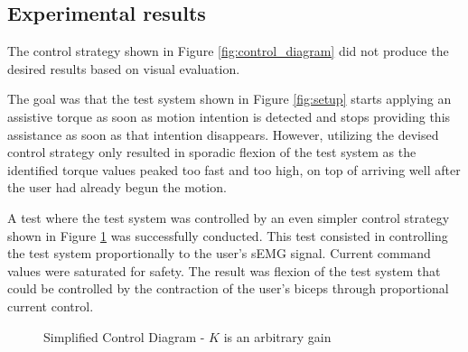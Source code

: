 \FloatBarrier
\subsection{Experimental results}
The control strategy shown in Figure \ref{fig:control_diagram} 
did not produce the desired results based on visual evaluation.  

The goal was that the test system shown in Figure \ref{fig:setup} 
starts applying an assistive torque as soon as motion intention is detected and 
stops providing this assistance as soon as that intention disappears. However, 
utilizing the devised control strategy only resulted in sporadic flexion of the 
test system as the identified torque values peaked too fast and too high, on top 
of arriving well after the user had already begun the motion.  

A test where the test system was controlled by an even simpler control strategy 
shown in Figure \ref{fig:simplified_control_diagram} was successfully conducted. This test consisted in 
controlling the test system proportionally to the user's sEMG signal. Current 
command values were saturated for safety. The result was flexion of the test 
system that could be controlled by the contraction of the user's biceps through 
proportional current control.

\begin{figure}[htbp]
    \centering
    \caption{
      Simplified Control Diagram - $K$ is an arbitrary gain 
    }
    \label{fig:simplified_control_diagram}
\end{figure}
\FloatBarrier
